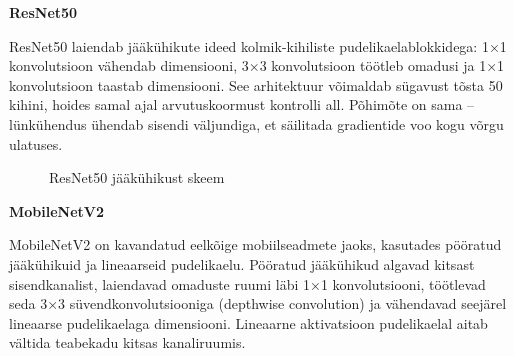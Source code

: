 \textbf{ResNet50}

ResNet50 laiendab jääkühikute ideed kolmik-kihiliste pudelikaelablokkidega: 1×1 konvolutsioon vähendab dimensiooni, 3×3 konvolutsioon töötleb omadusi ja 1×1 konvolutsioon taastab dimensiooni. See arhitektuur võimaldab sügavust tõsta 50 kihini, hoides samal ajal arvutuskoormust kontrolli all. Põhimõte on sama – lünkühendus ühendab sisendi väljundiga, et säilitada gradientide voo kogu võrgu ulatuses.

\begin{figure}[!ht]
    \centering
    \caption{ResNet50 jääkühikust skeem}
    \label{fig:ResNet50jääkühikust}
\end{figure}

\textbf{MobileNetV2}

MobileNetV2 on kavandatud eelkõige mobiilseadmete jaoks, kasutades pööratud jääkühikuid ja lineaarseid pudelikaelu. Pööratud jääkühikud algavad kitsast sisendkanalist, laiendavad omaduste ruumi läbi 1×1 konvolutsiooni, töötlevad seda 3×3 süvendkonvolutsiooniga (depthwise convolution) ja vähendavad seejärel lineaarse pudelikaelaga dimensiooni. Lineaarne aktivatsioon pudelikaelal aitab vältida teabekadu kitsas kanaliruumis.

